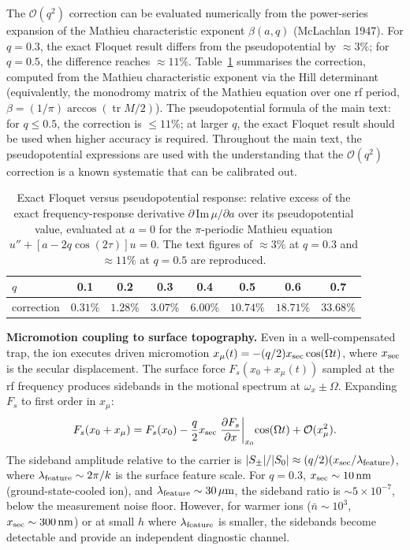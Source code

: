\documentclass[12pt,a4paper]{article}
\begin{document}
The $\mathcal{O}(q^2)$ correction can be evaluated numerically from the
power-series expansion of the Mathieu characteristic exponent
$\beta(a,q)$ (McLachlan 1947).  For $q = 0.3$, the exact Floquet
result differs from the pseudopotential by $\approx 3\%$; for $q = 0.5$, the
difference reaches $\approx 11\%$.  Table~\ref{tab:floquet} summarises the
correction, computed from the Mathieu characteristic exponent via the Hill
determinant (equivalently, the monodromy matrix of the Mathieu equation
over one rf period, $\beta=(1/\pi)\arccos(\operatorname{tr} M/2)$).  The
pseudopotential formula of the main text: for $q\le0.5$, the correction
is $\le 11\%$; at larger $q$, the exact Floquet result should be used
when higher accuracy is required.  Throughout
the main text, the pseudopotential expressions are used with the
understanding that the $\mathcal{O}(q^2)$ correction is a known systematic
that can be calibrated out.

\begin{table}[htb]
\centering
\caption{Exact Floquet versus pseudopotential response: relative excess of
the exact frequency-response derivative $\partial\,\mathrm{Im}\,\mu/\partial a$
over its pseudopotential value, evaluated at $a=0$ for the $\pi$-periodic
Mathieu equation $u''+[a-2q\cos(2\tau)]u=0$.  The text figures of
${\approx}3\%$ at $q=0.3$ and ${\approx}11\%$ at $q=0.5$ are reproduced.}
\label{tab:floquet}
\small
\begin{tabular}{@{}lccccccc@{}}
\hline
$q$ & 0.1 & 0.2 & 0.3 & 0.4 & 0.5 & 0.6 & 0.7 \\
\hline
correction & $0.31\%$ & $1.28\%$ & $3.07\%$ & $6.00\%$ & $10.74\%$ & $18.71\%$ & $33.68\%$ \\
\hline
\end{tabular}
\end{table}

\textbf{Micromotion coupling to surface topography.}
Even in a well-compensated trap, the ion executes driven micromotion
$x_\mu(t) = -(q/2)x_{\rm sec}\cos(\Omega t)$, where $x_{\rm sec}$ is the
secular displacement.  The surface force $F_s(x_0 + x_\mu(t))$ sampled at
the rf frequency produces sidebands in the motional spectrum at
$\omega_x \pm \Omega$.  Expanding $F_s$ to first order in $x_\mu$:
\begin{equation}
F_s(x_0 + x_\mu) = F_s(x_0) - \frac{q}{2}x_{\rm sec}
    \left.\frac{\partial F_s}{\partial x}\right|_{x_0}\!\cos(\Omega t)
    + \mathcal{O}(x_\mu^2).
\end{equation}
The sideband amplitude relative to the carrier is
$|S_{\pm}|/|S_0| \approx (q/2)(x_{\rm sec}/\lambda_{\rm feature})$,
where $\lambda_{\rm feature} \sim 2\pi/k$ is the surface feature scale.
For $q = 0.3$, $x_{\rm sec} \sim 10\,\textup{nm}$ (ground-state-cooled ion),
and $\lambda_{\rm feature} \sim 30\,\mu\textup{m}$, the sideband ratio is
${\sim}5 \times 10^{-7}$, below the measurement noise floor.  However,
for warmer ions ($\bar{n} \sim 10^3$, $x_{\rm sec} \sim 300\,\textup{nm}$)
or at small $h$ where $\lambda_{\rm feature}$ is smaller, the sidebands
become detectable and provide an independent diagnostic channel.
\end{document}
